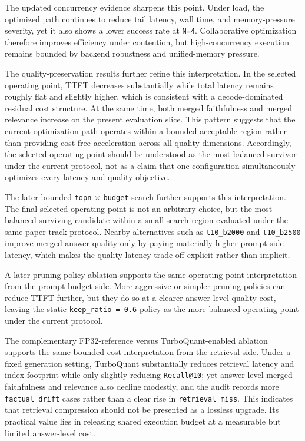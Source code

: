 \documentclass[10pt,twocolumn]{article}
\begin{document}
The updated concurrency evidence sharpens this point. Under load, the optimized path continues to reduce tail latency, wall time, and memory-pressure severity, yet it also shows a lower success rate at \texttt{N=4}. Collaborative optimization therefore improves efficiency under contention, but high-concurrency execution remains bounded by backend robustness and unified-memory pressure.

The quality-preservation results further refine this interpretation. In the selected operating point, TTFT decreases substantially while total latency remains roughly flat and slightly higher, which is consistent with a decode-dominated residual cost structure. At the same time, both merged faithfulness and merged relevance increase on the present evaluation slice. This pattern suggests that the current optimization path operates within a bounded acceptable region rather than providing cost-free acceleration across all quality dimensions. Accordingly, the selected operating point should be understood as the most balanced survivor under the current protocol, not as a claim that one configuration simultaneously optimizes every latency and quality objective.

The later bounded \texttt{topn} $\times$ \texttt{budget} search further supports this interpretation. The final selected operating point is not an arbitrary choice, but the most balanced surviving candidate within a small search region evaluated under the same paper-track protocol. Nearby alternatives such as \texttt{t10\_b2000} and \texttt{t10\_b2500} improve merged answer quality only by paying materially higher prompt-side latency, which makes the quality-latency trade-off explicit rather than implicit.

A later pruning-policy ablation supports the same operating-point interpretation from the prompt-budget side. More aggressive or simpler pruning policies can reduce TTFT further, but they do so at a clearer answer-level quality cost, leaving the static \texttt{keep\_ratio = 0.6} policy as the more balanced operating point under the current protocol.

The complementary FP32-reference versus TurboQuant-enabled ablation supports the same bounded-cost interpretation from the retrieval side. Under a fixed generation setting, TurboQuant substantially reduces retrieval latency and index footprint while only slightly reducing \texttt{Recall@10}; yet answer-level merged faithfulness and relevance also decline modestly, and the audit records more \texttt{factual\_drift} cases rather than a clear rise in \texttt{retrieval\_miss}. This indicates that retrieval compression should not be presented as a lossless upgrade. Its practical value lies in releasing shared execution budget at a measurable but limited answer-level cost.
\end{document}
